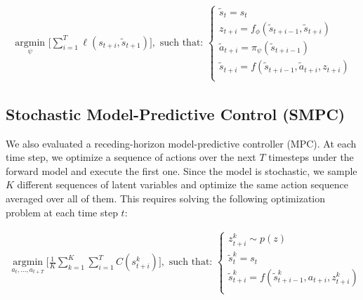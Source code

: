\documentclass{article} %
\begin{document}
    \begin{align*}
    \underset{\psi}{\mbox{ argmin }} \Big[ \sum_{i=1}^{T} \ell(s_{t+i}, \tilde{s}_{t+1}) \Big],  \mbox{ such that: }
    \begin{cases}
      \tilde{s}_t = s_t \\
      z_{t+i} = f_\phi(\tilde{s}_{t+i-1}, \tilde{s}_{t+i}) \\
      \tilde{a}_{t+i} = \pi_\psi(\tilde{s}_{t+i-1}) \\
      \tilde{s}_{t+i} = f(\tilde{s}_{t+i-1}, \tilde{a}_{t+i}, z_{t+i}) \\
      \end{cases}
  \end{align*}




    \subsection{Stochastic Model-Predictive Control (SMPC)}
    \label{MPC}

  We also evaluated a receding-horizon model-predictive controller (MPC). At each time step, we optimize a sequence of actions over the next $T$ timesteps under the forward model and execute the first one.
  Since the model is stochastic, we sample $K$ different sequences of latent variables and optimize the same action sequence averaged over all of them.
  This requires solving the following optimization problem at each time step $t$:

  \begin{align*}
    \underset{a_t, ..., a_{t+T}}{\mbox{ argmin }} \Big[ \frac{1}{K} \sum_{k=1}^K \sum_{i=1}^{T} C(s_{t+i}^k) \Big],  \mbox{ such that: }
    \begin{cases}
      z_{t+i}^k \sim p(z) \\
      \tilde{s}_t^k = s_t  \\
      \tilde{s}_{t+i}^k = f(\tilde{s}_{t+i-1}^k, a_{t+i}, z_{t+i}^k) \\
      \end{cases}
  \end{align*}
\end{document}
